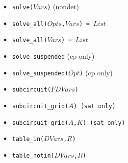 \documentclass[10pt]{article}
\begin{document}
\begin{multicols}{2}
\begin{scriptsize}
\begin{itemize}
\item \texttt{solve($Vars$)} (nondet)
\item \texttt{solve\_all($Opts$,$Vars$) = $List$}
\item \texttt{solve\_all($Vars$) = $List$}
\item \texttt{solve\_suspended} (cp only)
\item \texttt{solve\_suspended($Opt$)} (cp only)
\item \texttt{subcircuit($FDVars$)}
\item \texttt{subcircuit\_grid($A$) (sat only)}
\item \texttt{subcircuit\_grid($A$,$K$) (sat only)}
\item \texttt{table\_in($DVars$,$R$)}
\item \texttt{table\_notin($DVars$,$R$)}
\end{itemize}
\end{scriptsize}

\end{multicols}
\end{document}
